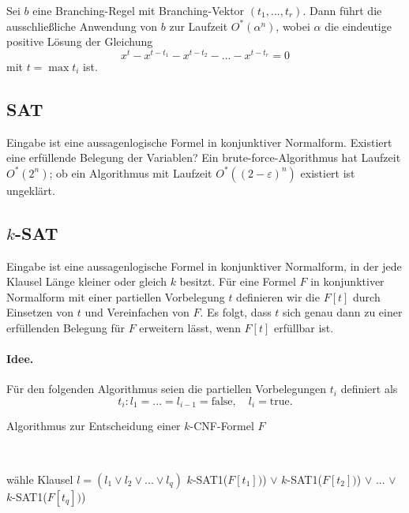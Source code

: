   \begin{theorem} \label{satzLaufzeit}
    Sei \(b\) eine Branching-Regel mit Branching-Vektor \( (t_1,...,t_r) \). Dann führt die ausschließliche Anwendung von \(b\) zur Laufzeit \(O^*(\alpha^n)\), wobei \(\alpha\) die eindeutige positive Lösung der Gleichung \[ x^t - x^{t-t_1} - x^{t - t_2} - ... - x^{t - t_r} = 0 \] mit \(t = \max t_i\) ist.
  \end{theorem}

\subsection{SAT}

  Eingabe ist eine aussagenlogische Formel in konjunktiver Normalform. Existiert eine erfüllende Belegung der Variablen? Ein brute-force-Algorithmus hat Laufzeit \(O^*(2^n)\); ob ein Algorithmus mit Laufzeit \(O^*( (2-\varepsilon)^n )\) existiert ist ungeklärt.

\subsection{$k$-SAT}

  Eingabe ist eine aussagenlogische Formel in konjunktiver Normalform, in der jede Klausel Länge kleiner oder gleich \(k\) besitzt. Für eine Formel \(F\) in konjunktiver Normalform mit einer partiellen Vorbelegung \(t\) definieren wir die  \(F[t]\) durch Einsetzen von \(t\) und Vereinfachen von \(F\). Es folgt, dass \(t\) sich genau dann zu einer erfüllenden Belegung für \(F\) erweitern lässt, wenn \(F[t]\) erfüllbar ist.

  \paragraph{Idee.} Für den folgenden Algorithmus seien die partiellen Vorbelegungen \(t_i\) definiert als \[ t_i: l_1 = ... = l_{i-1} = \text{false}, \quad l_i = \text{true}. \]

  \begin{algorithm}[H]
    \caption{Algorithmus zur Entscheidung einer \(k\)-CNF-Formel \(F\)}

     \\


    wähle Klausel \(l = (l_1 \vee l_2 \vee ... \vee l_q)\) \;
    \Return \(k\)-SAT1(\(F[t_1])\)) \(\vee\) \(k\)-SAT1(\(F[t_2])\)) \(\vee\) ... \(\vee\) \(k\)-SAT1(\(F[t_q])\))\;
  \end{algorithm}

